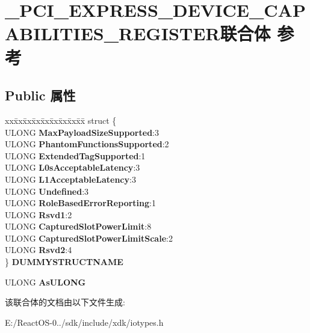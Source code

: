\hypertarget{union___p_c_i___e_x_p_r_e_s_s___d_e_v_i_c_e___c_a_p_a_b_i_l_i_t_i_e_s___r_e_g_i_s_t_e_r}{}\section{\+\_\+\+P\+C\+I\+\_\+\+E\+X\+P\+R\+E\+S\+S\+\_\+\+D\+E\+V\+I\+C\+E\+\_\+\+C\+A\+P\+A\+B\+I\+L\+I\+T\+I\+E\+S\+\_\+\+R\+E\+G\+I\+S\+T\+E\+R联合体 参考}
\label{union___p_c_i___e_x_p_r_e_s_s___d_e_v_i_c_e___c_a_p_a_b_i_l_i_t_i_e_s___r_e_g_i_s_t_e_r}
\subsection*{Public 属性}
\begin{DoxyCompactItemize}
\item 
\mbox{\label{union___p_c_i___e_x_p_r_e_s_s___d_e_v_i_c_e___c_a_p_a_b_i_l_i_t_i_e_s___r_e_g_i_s_t_e_r_a59e572cfb1382162291d721832f7e632}} 
\begin{tabbing}
xx\=xx\=xx\=xx\=xx\=xx\=xx\=xx\=xx\=\kill
struct \{\\
\>ULONG {\bfseries MaxPayloadSizeSupported}:3\\
\>ULONG {\bfseries PhantomFunctionsSupported}:2\\
\>ULONG {\bfseries ExtendedTagSupported}:1\\
\>ULONG {\bfseries L0sAcceptableLatency}:3\\
\>ULONG {\bfseries L1AcceptableLatency}:3\\
\>ULONG {\bfseries Undefined}:3\\
\>ULONG {\bfseries RoleBasedErrorReporting}:1\\
\>ULONG {\bfseries Rsvd1}:2\\
\>ULONG {\bfseries CapturedSlotPowerLimit}:8\\
\>ULONG {\bfseries CapturedSlotPowerLimitScale}:2\\
\>ULONG {\bfseries Rsvd2}:4\\
\} {\bfseries DUMMYSTRUCTNAME}\\

\end{tabbing}\item 
\mbox{\label{union___p_c_i___e_x_p_r_e_s_s___d_e_v_i_c_e___c_a_p_a_b_i_l_i_t_i_e_s___r_e_g_i_s_t_e_r_aec3ede5b937ff3f367cb2e9b29fa66ea}} 
U\+L\+O\+NG {\bfseries As\+U\+L\+O\+NG}
\end{DoxyCompactItemize}


该联合体的文档由以下文件生成\+:\begin{DoxyCompactItemize}
\item 
E\+:/\+React\+O\+S-\/0../sdk/include/xdk/iotypes.\+h\end{DoxyCompactItemize}
